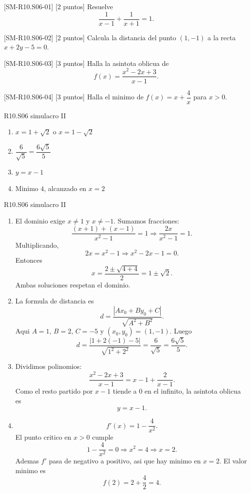 \begin{exercise}{[SM-R10.S06-01] [2 puntos] Resuelve
\[
\frac{1}{x-1}+\frac{1}{x+1}=1.
\]}
\end{exercise}

\begin{exercise}{[SM-R10.S06-02] [2 puntos] Calcula la distancia del punto \((1,-1)\) a la
recta \(x+2y-5=0\).}
\end{exercise}

\begin{exercise}{[SM-R10.S06-03] [3 puntos] Halla la asintota oblicua de
\[
f(x)=\frac{x^2-2x+3}{x-1}.
\]}
\end{exercise}

\begin{exercise}{[SM-R10.S06-04] [3 puntos] Halla el minimo de \(f(x)=x+\dfrac{4}{x}\) para
\(x>0\).}
\end{exercise}

\begin{shortanswer}{R10.S06 simulacro II}
\begin{enumerate}[label=\textbf{SM-R10.S06-\arabic*:}, leftmargin=*]
  \item \(x=1+\sqrt{2}\) o \(x=1-\sqrt{2}\)
  \item \(\dfrac{6}{\sqrt{5}}=\dfrac{6\sqrt{5}}{5}\)
  \item \(y=x-1\)
  \item Minimo \(4\), alcanzado en \(x=2\)
\end{enumerate}
\end{shortanswer}

\begin{fullsolution}{R10.S06 simulacro II}
\begin{enumerate}[label=\textbf{SM-R10.S06-\arabic*:}, leftmargin=*]
  \item El dominio exige \(x\neq 1\) y \(x\neq -1\). Sumamos fracciones:
  \[
  \frac{(x+1)+(x-1)}{x^2-1}=1
  \Longrightarrow \frac{2x}{x^2-1}=1.
  \]
  Multiplicando,
  \[
  2x=x^2-1 \Longrightarrow x^2-2x-1=0.
  \]
  Entonces
  \[
  x=\frac{2\pm \sqrt{4+4}}{2}=1\pm \sqrt{2}.
  \]
  Ambas soluciones respetan el dominio.
  \item La formula de distancia es
  \[
  d=\frac{|Ax_0+By_0+C|}{\sqrt{A^2+B^2}}.
  \]
  Aqui \(A=1\), \(B=2\), \(C=-5\) y \((x_0,y_0)=(1,-1)\). Luego
  \[
  d=\frac{|1+2(-1)-5|}{\sqrt{1^2+2^2}}=\frac{6}{\sqrt{5}}=\frac{6\sqrt{5}}{5}.
  \]
  \item Dividimos polinomios:
  \[
  \frac{x^2-2x+3}{x-1}=x-1+\frac{2}{x-1}.
  \]
  Como el resto partido por \(x-1\) tiende a \(0\) en el infinito, la asintota oblicua es
  \[
  y=x-1.
  \]
  \item
  \[
  f'(x)=1-\frac{4}{x^2}.
  \]
  El punto critico en \(x>0\) cumple
  \[
  1-\frac{4}{x^2}=0 \Longrightarrow x^2=4 \Longrightarrow x=2.
  \]
  Ademas \(f'\) pasa de negativo a positivo, asi que hay minimo en \(x=2\). El valor minimo es
  \[
  f(2)=2+\frac{4}{2}=4.
  \]
\end{enumerate}
\end{fullsolution}

